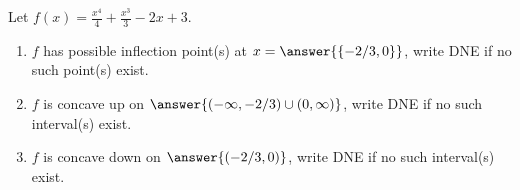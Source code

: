 \documentclass{ximera}
\author{Gregory Hartman \and Matthew Carr}
\begin{document}
\begin{exercise}




Let $f(x)=\frac{x^4}{4}+\frac{x^3}{3}-2x+3$. 
\begin{enumerate}
\item		$f$ has possible inflection point(s) at $x=\answer{\{-2/3,0\}}$, write DNE if no such point(s) exist.
\item		$f$ is concave up on $\answer{(-\infty,-2/3)\cup(0,\infty)}$, write DNE if no such interval(s) exist.
\item		$f$ is concave down on $\answer{(-2/3,0)}$, write DNE if no such interval(s) exist.
\end{enumerate}

\end{exercise}
\end{document}

